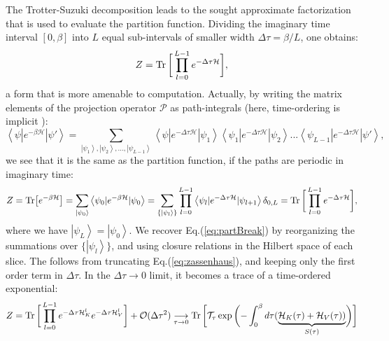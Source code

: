 The Trotter-Suzuki decomposition leads to the sought approximate factorization that is used to evaluate the partition function.
Dividing the imaginary time interval $[0, \beta ]$ into $L$ equal sub-intervals of smaller width $\Delta \tau = \beta / L$, one obtains:
\begin{equation}\label{eq:partBreak}
Z =  \operatorname{Tr} \bigg[ \prod_{l=0}^{L-1} e^{-\Delta\tau \mathcal{H} } \bigg] ,
\end{equation}
a form that is more amenable to computation.
Actually, by writing the matrix elements of the projection operator $\mathcal{P}$ as path-integrals (here, time-ordering is implicit \cite{hirsch_discrete_1983}):
\begin{equation}
\left\langle \psi | e^{-\beta \mathcal{H} } | \psi' \right\rangle = \sum_{\left| \psi_1 \right\rangle, \left| \psi_2 \right\rangle,..., \left| \psi_{L-1} \right\rangle }  \left\langle \psi | e^{-\Delta \tau \mathcal{H} } | \psi_1 \right\rangle \left\langle \psi_1 | e^{-\Delta \tau \mathcal{H} } | \psi_2 \right\rangle ... \left\langle \psi_{L - 1} | e^{-\Delta \tau \mathcal{H} } | \psi' \right\rangle ,
\end{equation}
we see that it is the same as the partition function, if the paths are periodic in imaginary time:
\begin{equation}
Z = \text{Tr} \big[ e^{-\beta \mathcal{H} } \big] = \sum_{\left| \psi_0 \right\rangle} \left\langle \psi_0 | e^{-\beta \mathcal{H}} | \psi_0 \right\rangle = \sum_{\{ \left| \psi_l \right\rangle \}} \prod_{l = 0}^{L - 1} \left\langle \psi_{l} | e^{-\Delta \tau \mathcal{H} } | \psi_{l+1} \right\rangle \delta_{0, L} = \operatorname{Tr} \bigg[ \prod_{l=0}^{L-1} e^{-\Delta\tau \mathcal{H} } \bigg] ,
\end{equation}
where we have $\left| \psi_L \right\rangle = \left| \psi_0 \right\rangle$. We recover Eq.(\ref{eq:partBreak}) by reorganizing the summations over $\{ \left| \psi_l \right\rangle \}$, and using closure relations in the Hilbert space of each slice.
The  follows from truncating Eq.(\ref{eq:zassenhaus}), and keeping only the first order term in $\Delta \tau$.
In the $\Delta \tau \rightarrow 0$ limit, it becomes a trace of a time-ordered exponential:
\begin{equation}\label{eq:Z_propagator}
Z = \operatorname{Tr} \bigg[ \prod_{l=0}^{L-1} e^{-\Delta\tau \mathcal{H}_{K}^l } e^{-\Delta\tau \mathcal{H}_{V}^l } \bigg] + \mathcal{O}(\Delta \tau^2) \underset{\tau \rightarrow 0}{\longrightarrow}
 \operatorname{Tr} \bigg[ \mathcal{T}_\tau \exp \bigg( {- \int_0^\beta   d\tau ( \underbrace{\mathcal{H}_K (\tau) + \mathcal{H}_V ( \tau) ) }_{S(\tau)} } \bigg) \bigg]
\end{equation}

